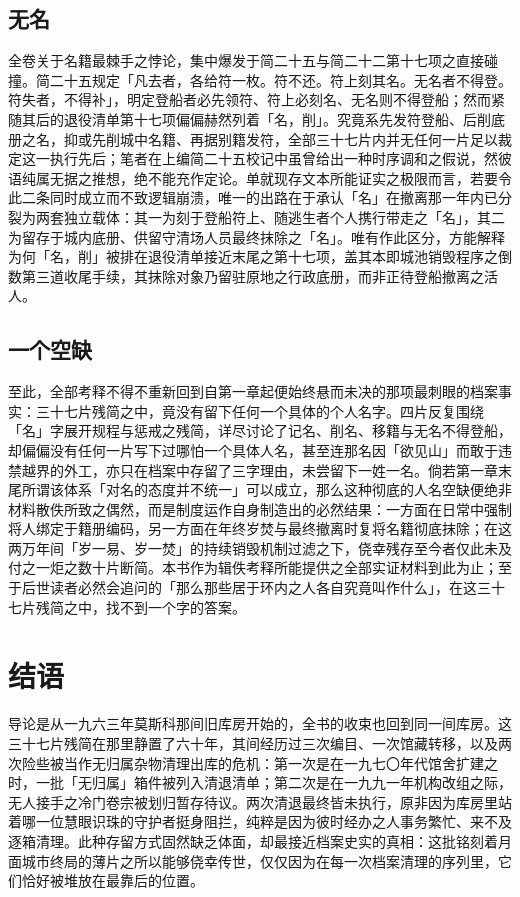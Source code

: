 \section{无名}

全卷关于名籍最棘手之悖论，集中爆发于简二十五与简二十二第十七项之直接碰撞。简二十五规定「凡去者，各给符一枚。符不还。符上刻其名。无名者不得登。符失者，不得补」，明定登船者必先领符、符上必刻名、无名则不得登船；然而紧随其后的退役清单第十七项偏偏赫然列着「名，削」。究竟系先发符登船、后削底册之名，抑或先削城中名籍、再据别籍发符，全部三十七片内并无任何一片足以裁定这一执行先后；笔者在上编简二十五校记中虽曾给出一种时序调和之假说，然彼语纯属无据之推想，绝不能充作定论。单就现存文本所能证实之极限而言，若要令此二条同时成立而不致逻辑崩溃，唯一的出路在于承认「名」在撤离那一年内已分裂为两套独立载体：其一为刻于登船符上、随逃生者个人携行带走之「名」，其二为留存于城内底册、供留守清场人员最终抹除之「名」。唯有作此区分，方能解释为何「名，削」被排在退役清单接近末尾之第十七项，盖其本即城池销毁程序之倒数第三道收尾手续，其抹除对象乃留驻原地之行政底册，而非正待登船撤离之活人。

\section{一个空缺}

至此，全部考释不得不重新回到自第一章起便始终悬而未决的那项最刺眼的档案事实：三十七片残简之中，竟没有留下任何一个具体的个人名字。四片反复围绕「名」字展开规程与惩戒之残简，详尽讨论了记名、削名、移籍与无名不得登船，却偏偏没有任何一片写下过哪怕一个具体人名，甚至连那名因「欲见山」而敢于违禁越界的外工，亦只在档案中存留了三字理由，未尝留下一姓一名。倘若第一章末尾所谓该体系「对名的态度并不统一」可以成立，那么这种彻底的人名空缺便绝非材料散佚所致之偶然，而是制度运作自身制造出的必然结果：一方面在日常中强制将人绑定于籍册编码，另一方面在年终岁焚与最终撤离时复将名籍彻底抹除；在这两万年间「岁一易、岁一焚」的持续销毁机制过滤之下，侥幸残存至今者仅此未及付之一炬之数十片断简。本书作为辑佚考释所能提供之全部实证材料到此为止；至于后世读者必然会追问的「那么那些居于环内之人各自究竟叫作什么」，在这三十七片残简之中，找不到一个字的答案。

\chapter*{结\quad 语}

导论是从一九六三年莫斯科那间旧库房开始的，全书的收束也回到同一间库房。这三十七片残简在那里静置了六十年，其间经历过三次编目、一次馆藏转移，以及两次险些被当作无归属杂物清理出库的危机：第一次是在一九七〇年代馆舍扩建之时，一批「无归属」箱件被列入清退清单；第二次是在一九九一年机构改组之际，无人接手之冷门卷宗被划归暂存待议。两次清退最终皆未执行，原非因为库房里站着哪一位慧眼识珠的守护者挺身阻拦，纯粹是因为彼时经办之人事务繁忙、来不及逐箱清理。此种存留方式固然缺乏体面，却最接近档案史实的真相：这批铭刻着月面城市终局的薄片之所以能够侥幸传世，仅仅因为在每一次档案清理的序列里，它们恰好被堆放在最靠后的位置。

